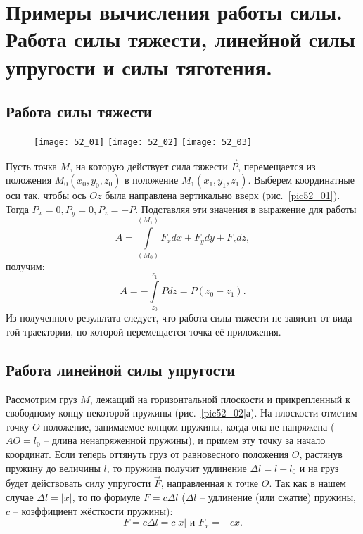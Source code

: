 \chapter{Примеры вычисления работы силы. Работа силы тяжести, линейной силы
упругости и силы тяготения.}

\section{Работа силы тяжести}
\begin{figure}[b]
    \texttt{[image: 52\_01]}\hfill
    \texttt{[image: 52\_02]}\hfill
    \texttt{[image: 52\_03]}
    \parbox{.32\textwidth}{\caption{} \label{pic52_01}}\hfill
    \parbox{.32\textwidth}{\caption{} \label{pic52_02}}\hfill
    \parbox{.32\textwidth}{\caption{} \label{pic52_03}}
\end{figure}
Пусть точка \( M \), на которую действует сила тяжести \( \vec{P} \), 
перемещается из положения \( M_0(x_0, y_0, z_0) \) в положение 
\( M_1(x_1, y_1, z_1) \). Выберем координатные оси так, чтобы ось \( Oz \) 
была направлена вертикально вверх (рис.~\ref{pic52_01}). Тогда 
\( P_x = 0, P_y = 0, P_z = -P \). Подставляя эти значения в выражение для работы
\begin{equation}
    A = \int\limits_{(M_0)}^{(M_1)} F_x dx + F_y dy + F_z dz,
    \label{eq:1}    
\end{equation}
получим:
\[ 
    A = - \int\limits_{z_0}^{z_1} Pdz = 
    P\left(z_0 - z_1 \right).
\]
Из полученного результата следует, что работа силы тяжести не зависит от 
вида той траектории, по которой перемещается точка её приложения.

\section{Работа линейной силы упругости}
Рассмотрим груз \( M \), лежащий на горизонтальной плоскости и 
прикрепленный к свободному концу некоторой пружины (рис.~\ref{pic52_02}а). На 
плоскости отметим точку \( O \) положение, занимаемое концом пружины, 
когда она не напряжена (\( AO = l_0 \) -- длина ненапряженной пружины), и 
примем эту точку за начало координат. Если теперь оттянуть груз от 
равновесного положения \( O \), растянув пружину до величины \( l \), то
пружина получит удлинение \( \Delta l = l - l_0 \) и на груз будет действовать 
силу упругости \( \vec{F} \), направленная к точке \( O \). Так как в 
нашем случае \( \Delta l = |x| \), то по формуле \( F = c\Delta l \) 
(\( \Delta l \) -- удлинение (или сжатие) пружины, \( c \) -- коэффициент 
жёсткости пружины):
\[
    F = c\Delta l = c|x| \text{ и } F_x = -cx.
\]

